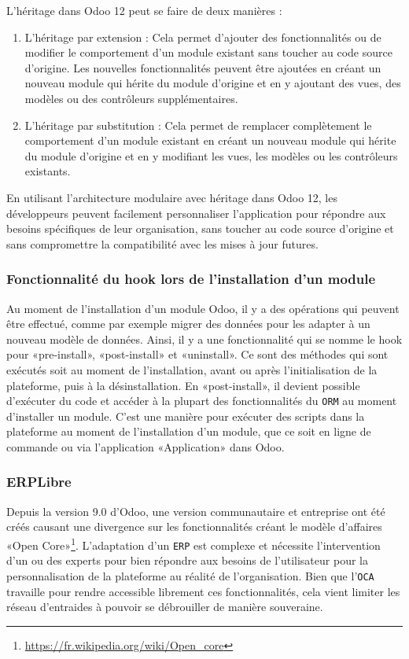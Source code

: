 L’héritage dans Odoo 12 peut se faire de deux manières : 
\begin{enumerate}
    \item L’héritage par extension : Cela permet d’ajouter des fonctionnalités ou de modifier le comportement d’un module existant sans toucher au code source d’origine. Les nouvelles fonctionnalités peuvent être ajoutées en créant un nouveau module qui hérite du module d’origine et en y ajoutant des vues, des modèles ou des contrôleurs supplémentaires.
    \item L’héritage par substitution : Cela permet de remplacer complètement le comportement d’un module existant en créant un nouveau module qui hérite du module d’origine et en y modifiant les vues, les modèles ou les contrôleurs existants.
\end{enumerate}
En utilisant l’architecture modulaire avec héritage dans Odoo 12, les développeurs peuvent facilement personnaliser l’application pour répondre aux besoins spécifiques de leur organisation, sans toucher au code source d’origine et sans compromettre la compatibilité avec les mises à jour futures.


\subsubsection{Fonctionnalité du hook lors de l’installation d’un module}

Au moment de l’installation d’un module Odoo, il y a des opérations qui peuvent être effectué, comme par exemple migrer des données pour les adapter à un nouveau modèle de données. Ainsi, il y a une fonctionnalité qui se nomme le hook pour «pre-install», «post-install» et «uninstall». Ce sont des méthodes qui sont exécutés soit au moment de l’installation, avant ou après l’initialisation de la plateforme, puis à la désinstallation. En «post-install», il devient possible d’exécuter du code et accéder à la plupart des fonctionnalités du \texttt{ORM} au moment d’installer un module. C’est une manière pour exécuter des scripts dans la plateforme au moment de l’installation d’un module, que ce soit en ligne de commande ou via l’application «Application» dans Odoo.

\subsubsection{ERPLibre}

Depuis la version 9.0 d'Odoo, une version communautaire et entreprise ont été créés causant une divergence sur les fonctionnalités créant le modèle d'affaires «Open Core»\footnote{\url{https://fr.wikipedia.org/wiki/Open_core}}. L'adaptation d'un \texttt{ERP} est complexe et nécessite l'intervention d'un ou des experts pour bien répondre aux besoins de l'utilisateur pour la personnalisation de la plateforme au réalité de l'organisation. Bien que l'\texttt{OCA} travaille pour rendre accessible librement ces fonctionnalités, cela vient limiter les réseau d'entraides à pouvoir se débrouiller de manière souveraine.

